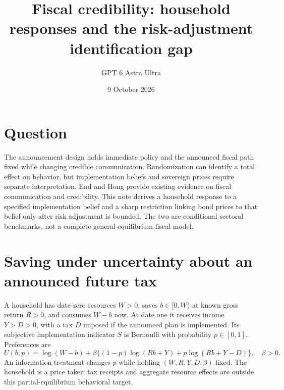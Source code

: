 \documentclass[11pt]{article}
\title{Fiscal credibility: household responses and the risk-adjustment identification gap}
\author{GPT 6 Astra Ultra}
\date{9 October 2026}
\theoremstyle{definition}
\begin{document}
\maketitle
\section*{Question}
The announcement design holds immediate policy and the announced fiscal path fixed while changing credible communication. Randomization can identify a total effect on behavior, but implementation beliefs and sovereign prices require separate interpretation. End and Hong \cite{imf} provide existing evidence on fiscal communication and credibility. This note derives a household response to a specified implementation belief and a sharp restriction linking bond prices to that belief only after risk adjustment is bounded. The two are conditional sectoral benchmarks, not a complete general-equilibrium fiscal model.

\section*{Saving under uncertainty about an announced future tax}
A household has date-zero resources $W>0$, saves $b\in[0,W)$ at known gross return $R>0$, and consumes $W-b$ now. At date one it receives income $Y>D>0$, with a tax $D$ imposed if the announced plan is implemented. Its subjective implementation indicator $S$ is Bernoulli with probability $p\in[0,1]$. Preferences are
\[
 U(b,p)=\log(W-b)+\beta\{(1-p)\log(Rb+Y)
                  +p\log(Rb+Y-D)\},\quad\beta>0.
 \tag{1}
\]
An information treatment changes $p$ while holding $(W,R,Y,D,\beta)$ fixed. The household is a price taker; tax receipts and aggregate resource effects are outside this partial-equilibrium behavioral target.
\end{document}
